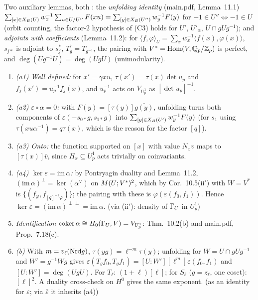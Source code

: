\begin{outline}
Two auxiliary lemmas, both \stproved: the \emph{unfolding identity} (main.pdf, Lemma~11.1) $\sum_{[x]\in X_B(U)}w_x^{-1}\sum_{u\in U/U''}F(xu)=\sum_{[y]\in X_B(U'')}w_y^{-1}F(y)$
for $-1\in U''\iff-1\in U$ (orbit counting, the factor-$2$ hypothesis of (C3) holds for $U'$, $U'_\alpha$, $U\cap gUg^{-1}$); and \emph{adjoints with coefficients}
(Lemma~11.2): for $\langle f,\varphi\rangle_U=\sum_xw_x^{-1}\langle f(x),\varphi(x)\rangle$, $s_{j*}$ is adjoint to $s_j^*$, $T_g^\dagger=T_{g^{-1}}$, the
pairing with $V^*=\operatorname{Hom}(V,\mathbb{Q}_p/\mathbb{Z}_p)$ is perfect, and $\deg(Ug^{-1}U)=\deg(UgU)$ (unimodularity).
\begin{enumerate}[label=(\arabic*)]
\item \emph{(a1) Well defined:} for $x'=\gamma xu$, $\tau(x')=\tau(x)\det u_p$ and $f_j(x')=u_p^{-1}f_j(x)$, and $u_p^{-1}$ acts on $V_{U^1_p}$ as $[\det u_p]^{-1}$. \stproved
\item \emph{(a2) $\varepsilon\circ\alpha=0$:} with $F(y)=[\tau(y)]\overline{g(y)}$, unfolding turns both components of $\varepsilon(-s_{0*}g,s_{1*}g)$ into $\sum_{[y]\in X_B(U')}w_y^{-1}F(y)$
  (for $s_1$ using $\tau(xu\alpha^{-1})=q\tau(x)$, which is the reason for the factor $[q]$). \stproved
\item \emph{(a3) Onto:} the function supported on $[x]$ with value $N_xv$ maps to $[\tau(x)]\bar v$, since $H_x\subseteq U^1_p$ acts trivially on coinvariants. \stproved
\item \emph{(a4) $\ker\varepsilon=\mathrm{im}\,\alpha$:} by Pontryagin duality and Lemma~11.2, $(\mathrm{im}\,\alpha)^\perp=\ker(\alpha^\vee)$ on $M(U;V^*)^2$, which
  by Cor.~10.5(ii$'$) with $W=V^*$ is $\{(f_\varphi,f_{[q]^{-1}\varphi})\}$; the pairing with these is $\varphi(\varepsilon(f_0,f_1))$. Hence
  $\ker\varepsilon=(\mathrm{im}\,\alpha)^{\perp\perp}=\mathrm{im}\,\alpha$. \stpmc{} (via (ii$'$): density of $\Gamma_U$ in $U^1_p$)
\item \emph{Identification} $\operatorname{coker}\alpha\cong H_0(\Gamma_U,V)=V_{U^1_p}$: Thm.~10.2(b) and main.pdf, Prop.~7.18(c). \stpmc
\item \emph{(b)} With $m=v_\ell(\mathrm{Nrd} g)$, $\tau(yg)=\ell^{-m}\tau(y)$; unfolding for $W=U\cap gUg^{-1}$ and $W'=g^{-1}Wg$ gives
  $\varepsilon(T_gf_0,T_gf_1)=[U:W'][\ell^m]\varepsilon(f_0,f_1)$ and $[U:W']=\deg(UgU)$. For $T_\ell$: $(1+\ell)[\ell]$; for $S_\ell$ ($g=z_\ell$, one coset): $[\ell]^2$.
  A duality cross-check on $H^0$ gives the same exponent. \stproved{} (as an identity for $\varepsilon$; via $\bar\varepsilon$ it inherits (a4))

\end{enumerate}
\end{outline}
